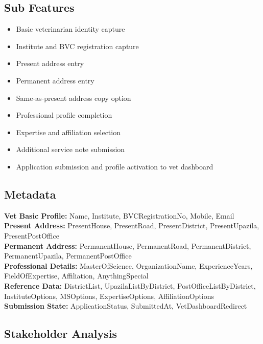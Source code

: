 \documentclass[12pt]{article}
\begin{document}
\subsection{Sub Features}
\begin{itemize}
    \item Basic veterinarian identity capture
    \item Institute and BVC registration capture
    \item Present address entry
    \item Permanent address entry
    \item Same-as-present address copy option
    \item Professional profile completion
    \item Expertise and affiliation selection
    \item Additional service note submission
    \item Application submission and profile activation to vet dashboard
\end{itemize}

\subsection{Metadata}
\textbf{Vet Basic Profile:} Name, Institute, BVCRegistrationNo, Mobile, Email\\
\textbf{Present Address:} PresentHouse, PresentRoad, PresentDistrict, PresentUpazila, PresentPostOffice\\
\textbf{Permanent Address:} PermanentHouse, PermanentRoad, PermanentDistrict, PermanentUpazila, PermanentPostOffice\\
\textbf{Professional Details:} MasterOfScience, OrganizationName, ExperienceYears, FieldOfExpertise, Affiliation, AnythingSpecial\\
\textbf{Reference Data:} DistrictList, UpazilaListByDistrict, PostOfficeListByDistrict, InstituteOptions, MSOptions, ExpertiseOptions, AffiliationOptions\\
\textbf{Submission State:} ApplicationStatus, SubmittedAt, VetDashboardRedirect

\subsection{Stakeholder Analysis}
\end{document}
